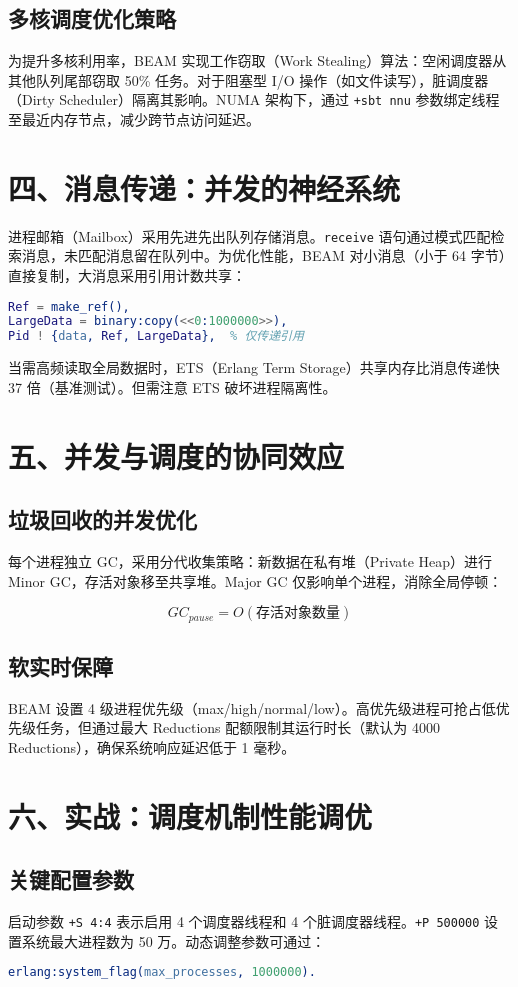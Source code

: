 \section{多核调度优化策略}
为提升多核利用率，BEAM 实现工作窃取（Work Stealing）算法：空闲调度器从其他队列尾部窃取 50\%{} 任务。对于阻塞型 I/O 操作（如文件读写），脏调度器（Dirty Scheduler）隔离其影响。NUMA 架构下，通过 \verb!+sbt nnu! 参数绑定线程至最近内存节点，减少跨节点访问延迟。\par
\chapter{四、消息传递：并发的神经系统}
进程邮箱（Mailbox）采用先进先出队列存储消息。\verb!receive! 语句通过模式匹配检索消息，未匹配消息留在队列中。为优化性能，BEAM 对小消息（小于 64 字节）直接复制，大消息采用引用计数共享：\par
\begin{lstlisting}[language=erlang]
% 大消息传递优化（引用计数）
Ref = make_ref(),
LargeData = binary:copy(<<0:1000000>>),
Pid ! {data, Ref, LargeData},  % 仅传递引用
\end{lstlisting}
当需高频读取全局数据时，ETS（Erlang Term Storage）共享内存比消息传递快 37 倍（基准测试）。但需注意 ETS 破坏进程隔离性。\par
\chapter{五、并发与调度的协同效应}
\section{垃圾回收的并发优化}
每个进程独立 GC，采用分代收集策略：新数据在私有堆（Private Heap）进行 Minor GC，存活对象移至共享堆。Major GC 仅影响单个进程，消除全局停顿：\par
$$GC_{pause} = O(存活对象数量)$$\par
\section{软实时保障}
BEAM 设置 4 级进程优先级（max/high/normal/low）。高优先级进程可抢占低优先级任务，但通过最大 Reductions 配额限制其运行时长（默认为 4000 Reductions），确保系统响应延迟低于 1 毫秒。\par
\chapter{六、实战：调度机制性能调优}
\section{关键配置参数}
启动参数 \verb!+S 4:4! 表示启用 4 个调度器线程和 4 个脏调度器线程。\verb!+P 500000! 设置系统最大进程数为 50 万。动态调整参数可通过：\par
\begin{lstlisting}[language=erlang]
% 运行时调整最大进程数
erlang:system_flag(max_processes, 1000000).
\end{lstlisting}
